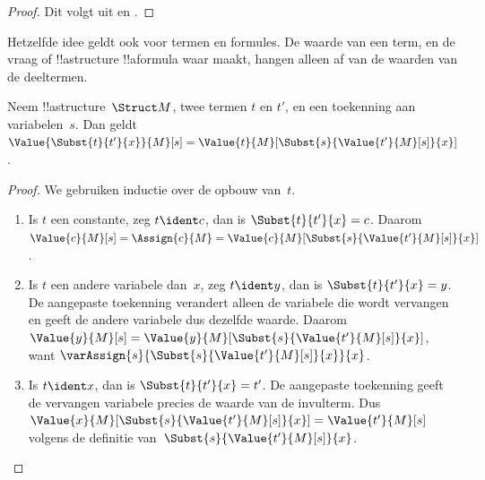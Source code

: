 \documentclass[../../../include/open-logic-section]{subfiles}
\begin{document}
\begin{proof}
Dit volgt uit  en
.
\end{proof}

Hetzelfde idee geldt ook voor termen en formules. De waarde van een
term, en de vraag of !!a{structure} !!a{formula} waar maakt, hangen
alleen af van de waarden van de deeltermen.

\begin{prop}
Neem !!a{structure}~$\Struct M$, twee termen $t$ en $t'$, en een
toekenning aan variabelen~$s$. Dan geldt
$\Value{\Subst{t}{t'}{x}}{M}[s] =
\Value{t}{M}[\Subst{s}{\Value{t'}{M}[s]}{x}]$.
\end{prop}

\begin{proof}
We gebruiken inductie over de opbouw van~$t$.
\begin{enumerate}
\item Is $t$ een constante, zeg $t\ident c$, dan is
  $\Subst{t}{t'}{x} = c$. Daarom
  $\Value{c}{M}[s] = \Assign{c}{M} =
  \Value{c}{M}[\Subst{s}{\Value{t'}{M}[s]}{x}]$.

\item Is $t$ een andere variabele dan~$x$, zeg $t \ident y$, dan is
  $\Subst{t}{t'}{x} = y$. De aangepaste toekenning verandert alleen
  de variabele die wordt vervangen en geeft de andere variabele dus
  dezelfde waarde. Daarom
  $\Value{y}{M}[s] =
  \Value{y}{M}[\Subst{s}{\Value{t'}{M}[s]}{x}]$, want
  $\varAssign{s}{\Subst{s}{\Value{t'}{M}[s]}{x}}{x}$.

\item Is $t \ident x$, dan is $\Subst{t}{t'}{x} = t'$. De aangepaste
  toekenning geeft de vervangen variabele precies de waarde van de
  invulterm. Dus
  $\Value{x}{M}[\Subst{s}{\Value{t'}{M}[s]}{x}] = \Value{t'}{M}[s]$
  volgens de definitie van~$\Subst{s}{\Value{t'}{M}[s]}{x}$.


\end{enumerate}
\end{proof}
\end{document}

